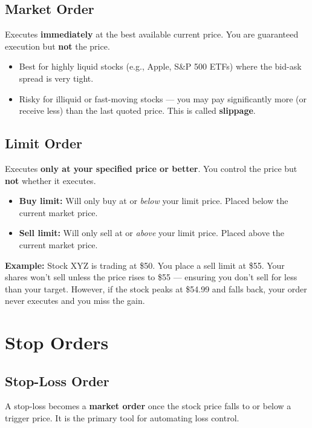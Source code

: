 \documentclass[11pt, letterpaper]{article}
\begin{document}
\subsection*{Market Order}
Executes \textbf{immediately} at the best available current price. You are guaranteed execution but \textbf{not} the price.
\begin{itemize}[noitemsep]
  \item Best for highly liquid stocks (e.g., Apple, S\&P 500 ETFs) where the bid-ask spread is very tight.
  \item Risky for illiquid or fast-moving stocks --- you may pay significantly more (or receive less) than the last quoted price. This is called \textbf{slippage}.
\end{itemize}

\subsection*{Limit Order}
Executes \textbf{only at your specified price or better}. You control the price but \textbf{not} whether it executes.

\begin{itemize}[noitemsep]
  \item \textbf{Buy limit:} Will only buy at or \emph{below} your limit price. Placed below the current market price.
  \item \textbf{Sell limit:} Will only sell at or \emph{above} your limit price. Placed above the current market price.
\end{itemize}

\begin{tcolorbox}[colback=part4bg, colframe=sectionorange, arc=3pt, boxrule=1pt]
\textbf{Example:} Stock XYZ is trading at \$50. You place a sell limit at \$55. Your shares won't sell unless the price rises to \$55 --- ensuring you don't sell for less than your target. However, if the stock peaks at \$54.99 and falls back, your order never executes and you miss the gain.
\end{tcolorbox}

\section*{Stop Orders}

\subsection*{Stop-Loss Order}
A stop-loss becomes a \textbf{market order} once the stock price falls to or below a trigger price. It is the primary tool for automating loss control.
\end{document}
